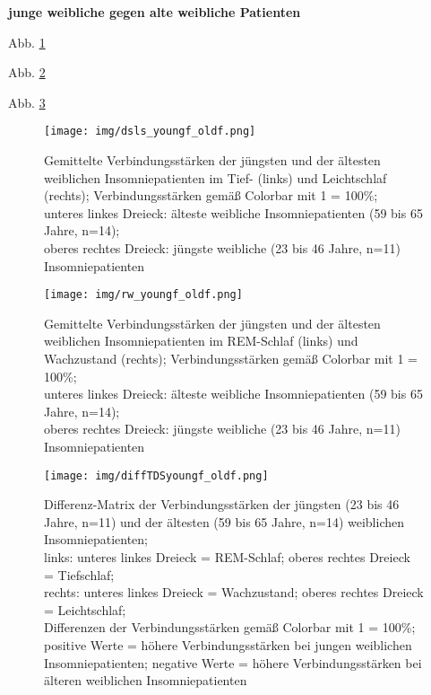 \textbf{junge weibliche gegen alte weibliche Patienten}

Abb. \ref{fig:dsls_youngf_oldf}

Abb. \ref{fig:rw_youngf_oldf}

Abb. \ref{fig:diffTDSyoungf_oldf}

\begin{figure}[H]
	\centering
	\texttt{[image: img/dsls\_youngf\_oldf.png]}
	\caption[Verbindungsstärken der jüngsten und der ältesten weiblichen Insomniepatienten im Tief- und Leichtschlaf]{Gemittelte Verbindungsstärken der jüngsten und der ältesten weiblichen Insomniepatienten im Tief- (links) und Leichtschlaf (rechts); Verbindungsstärken gemäß Colorbar mit 1 = 100\%;\\unteres linkes Dreieck: älteste weibliche Insomniepatienten (59 bis 65 Jahre, n=14);\\oberes rechtes Dreieck: jüngste weibliche (23 bis 46 Jahre, n=11) Insomniepatienten}
	\label{fig:dsls_youngf_oldf}
\end{figure}

\begin{figure}[H]
	\centering
	\texttt{[image: img/rw\_youngf\_oldf.png]}
	\caption[Verbindungsstärken der jüngsten und der ältesten weiblichen Insomniepatienten im REM-Schlaf und Wachzustand]{Gemittelte Verbindungsstärken der jüngsten und der ältesten weiblichen Insomniepatienten im REM-Schlaf (links) und Wachzustand (rechts); Verbindungsstärken gemäß Colorbar mit 1 = 100\%;\\unteres linkes Dreieck: älteste weibliche Insomniepatienten (59 bis 65 Jahre, n=14);\\oberes rechtes Dreieck: jüngste weibliche (23 bis 46 Jahre, n=11) Insomniepatienten}
	\label{fig:rw_youngf_oldf}
\end{figure}

\begin{figure}[H]
	\centering
	\texttt{[image: img/diffTDSyoungf\_oldf.png]}
	\caption[Differenz-Matrix der Verbindungsstärken der jüngsten und ältesten weiblichen Insomniepatienten]{Differenz-Matrix der Verbindungsstärken der jüngsten (23 bis 46 Jahre, n=11) und der ältesten (59 bis 65 Jahre, n=14) weiblichen Insomniepatienten;\\links: unteres linkes Dreieck = REM-Schlaf; oberes rechtes Dreieck = Tiefschlaf;\\rechts: unteres linkes Dreieck = Wachzustand; oberes rechtes Dreieck = Leichtschlaf;\\Differenzen der Verbindungsstärken gemäß Colorbar mit 1 = 100\%;\\positive Werte = höhere Verbindungsstärken bei jungen weiblichen Insomniepatienten; negative Werte = höhere Verbindungsstärken bei älteren weiblichen Insomniepatienten}
	\label{fig:diffTDSyoungf_oldf}
\end{figure}



